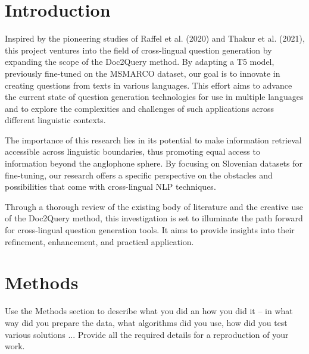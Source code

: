 \documentclass[fleqn,moreauthors,10pt]{ds_report}
\affiliation{\textit{Advisors: Boshko}}
\begin{document}
\flushbottom 

\maketitle 

\thispagestyle{empty} 


\section*{Introduction}
	Inspired by the pioneering studies of Raffel et al. (2020) and Thakur et al. (2021), this project ventures into the field of cross-lingual question generation by expanding the scope of the Doc2Query method. By adapting a T5 model, previously fine-tuned on the MSMARCO dataset, our goal is to innovate in creating questions from texts in various languages. This effort aims to advance the current state of question generation technologies for use in multiple languages and to explore the complexities and challenges of such applications across different linguistic contexts.

	The importance of this research lies in its potential to make information retrieval accessible across linguistic boundaries, thus promoting equal access to information beyond the anglophone sphere. By focusing on Slovenian datasets for fine-tuning, our research offers a specific perspective on the obstacles and possibilities that come with cross-lingual NLP techniques.

	Through a thorough review of the existing body of literature and the creative use of the Doc2Query method, this investigation is set to illuminate the path forward for cross-lingual question generation tools. It aims to provide insights into their refinement, enhancement, and practical application.



\section*{Methods}

Use the Methods section to describe what you did an how you did it -- in what way did you prepare the data, what algorithms did you use, how did you test various solutions ... Provide all the required details for a reproduction of your work.
\end{document}
